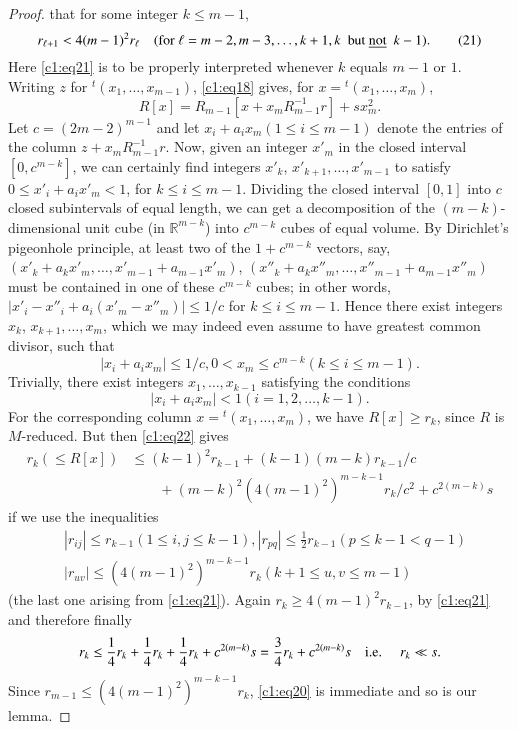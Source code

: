 \begin{proof}
that for some integer $k\leq m-1$,
\begin{equation*}
r_{\ell+1}<4(m-1)^{2}r_{\ell} \quad (\text{for } \ell=m-2,
  m-3,\ldots,k+1,k\text{ \  but \underline{not} \ } k-1).\tag{21}\label{c1:eq21}
\end{equation*}
Here \eqref{c1:eq21} is to be properly interpreted whenever $k$ equals
$m-1$ or $1$. Writing $z$ for ${}^{t}(x_{1},\ldots,x_{m-1})$,
\eqref{c1:eq18} gives, for $x={}^{t}(x_{1},\ldots,x_{m})$,
\begin{equation*}
R[x]=R_{m-1}[x+x_{m}R^{-1}_{m-1}r]+sx^{2}_{m}.\tag{22}\label{c1:eq22}
\end{equation*}
Let $c=(2m-2)^{m-1}$ and let $x_{i}+a_{i}x_{m}(1\leq i\leq m-1)$
denote the entries of the column $z+x_{m}R^{-1}_{m-1}r$. Now, given an
integer $x'_{m}$ in the closed interval $[0,c^{m-k}]$, we can
certainly find integers $x'_{k}$, $x'_{k+1},\ldots,x'_{m-1}$ to
satisfy $0\leq x'_i + a_{i}x'_{m}<1$, for $k\leq i\leq m-1$. Dividing
the closed interval $[0,1]$ into $c$ closed subintervals of equal
length, we can get a decomposition of the $(m-k)$-dimensional unit
cube (in $\mathbb{R}^{m-k}$) into $c^{m-k}$ cubes of equal volume. By
Dirichlet's pigeonhole principle, at least two of the $1+c^{m-k}$
vectors, say, $(x'_{k}+a_{k}x'_{m},\ldots,x'_{m-1}+a_{m-1}x'_{m})$,
$(x''_{k}+a_{k}x''_{m},\ldots,x''_{m-1}+a_{m-1}x''_{m})$ must be
contained in one of these $c^{m-k}$ cubes; in other words,
$|x'_{i}-x''_{i}+a_{i}(x'_{m}-x''_{m})|\leq 1/c$ for $k\leq i\leq
m-1$. Hence there exist integers $x_{k}$, $x_{k+1},\ldots,x_{m}$,
which we may indeed even assume to have greatest common 
divisor, such that
$$
|x_{i}+a_{i}x_{m}|\leq 1/c, 0<x_{m}\leq c^{m-k}(k\leq i\leq m-1).
$$
Trivially, there exist integers $x_{1},\ldots,x_{k-1}$ satisfying the
conditions 
$$
|x_{i}+a_{i}x_{m}|<1(i=1,2,\ldots,k-1).
$$
For the corresponding column $x={}^{t}(x_{1},\ldots,x_{m})$, we have
$R[x]\geq r_{k}$, since $R$ is $M$-reduced. But then \eqref{c1:eq22}
gives
\begin{align*}
r_{k}(\leq R[x])&\leq
(k-1)^{2}r_{k-1}+(k-1) (m-k)r_{k-1} / c\\
&\qquad+(m-k)^{2} (4(m-1)^{2})^{m-k-1}
r_{k} / c^{2}+c^{2(m-k)}s
\end{align*}
if we use the inequalities
\begin{align*}
& |r_{ij}|\leq r_{k-1}(1\leq i, j\leq k-1), |r_{pq}|\leq
\frac{1}{2}r_{k-1}(p\leq k-1<q-1)\\
& |r_{uv}|\leq (4(m-1)^{2})^{m-k-1}r_{k}(k+1\leq u, v\leq m-1)
\end{align*}
(the last one arising from \eqref{c1:eq21}). Again $r_{k}\geq
4(m-1)^{2}r_{k-1}$, by \eqref{c1:eq21} and therefore finally
$$
r_{k}\leq
\frac{1}{4}r_{k}+\frac{1}{4}r_{k}+\frac{1}{4}r_{k}+c^{2(m-k)}s=\frac{3}{4}r_{k}+c^{2(m-k)}s\quad\text{{i.e.}\kern.3em}\quad
r_{k}\ll s.
$$
Since $r_{m-1}\leq (4(m-1)^{2})^{m-k-1}r_{k}$, \eqref{c1:eq20} is
immediate and so is our lemma.
\end{proof}

